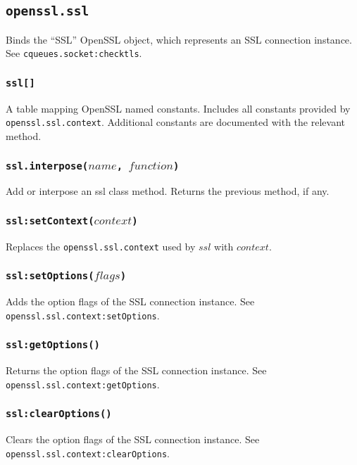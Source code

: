 \documentclass[11pt, oneside]{memoir}
\newcommand*{\fn}[1]{\texttt{#1}\xspace}
\newcommand*{\method}[1]{\texttt{#1}\xspace}
\newcommand*{\module}[1]{\texttt{#1}\xspace}
\newcounter{toccols}
\newenvironment{Module}[1]{
	\subsection{\texttt{#1}}
	\addtocontents{toc}{
		\protect\begin{multicols}{\value{toccols}}
	}
}{
	\addtocontents{toc}{\protect\end{multicols}}
}
\begin{document}
\begin{Module}{openssl.ssl}

Binds the ``SSL'' OpenSSL object, which represents an SSL connection instance. See \method{cqueues.socket:checktls}.

\subsubsection[\fn{ssl[]}]{\fn{ssl[]}}

A table mapping OpenSSL named constants. Includes all constants provided by \module{openssl.ssl.context}. Additional constants are documented with the relevant method.

\subsubsection[\fn{ssl.interpose}]{\fn{ssl.interpose($name$, $function$)}}
Add or interpose an ssl class method. Returns the previous method, if any.

\subsubsection[\fn{ssl:setContext}]{\fn{ssl:setContext($context$)}}

Replaces the \module{openssl.ssl.context} used by $ssl$ with $context$.

\subsubsection[\fn{ssl:setOptions}]{\fn{ssl:setOptions($flags$)}}

Adds the option flags of the SSL connection instance. See \fn{openssl.ssl.context:setOptions}.

\subsubsection[\fn{ssl:getOptions}]{\fn{ssl:getOptions()}}

Returns the option flags of the SSL connection instance. See \fn{openssl.ssl.context:getOptions}.

\subsubsection[\fn{ssl:clearOptions}]{\fn{ssl:clearOptions()}}

Clears the option flags of the SSL connection instance. See \fn{openssl.ssl.context:clearOptions}.


\end{Module}
\end{document}
